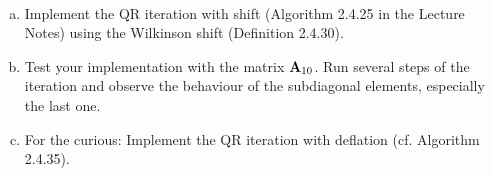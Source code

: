 \begin{Sheet}
\begin{Problem}
	\hfill\\\vspace{-6ex}
	\begin{enumerate}[(a)]
		\item Implement the QR iteration with shift (Algorithm 2.4.25 in the Lecture Notes) using the Wilkinson shift (Definition 2.4.30).
		\item Test your implementation with the matrix $\mathbf A_{10}$. Run several steps of the iteration and observe the behaviour of the subdiagonal elements, especially the last one.
		\item For the curious: Implement the QR iteration with deflation (cf. Algorithm 2.4.35).
	\end{enumerate} 		
\end{Problem}

\end{Sheet}


